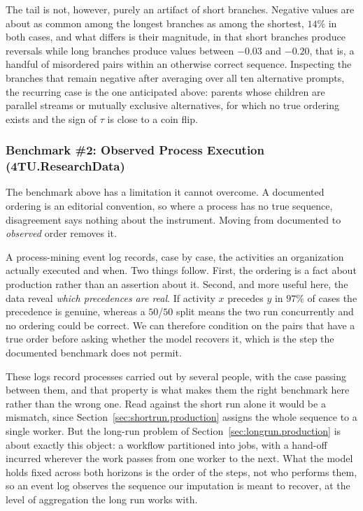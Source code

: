 The tail is not, however, purely an artifact of short branches.
Negative values are about as common among the longest branches as among the shortest, $14\%$ in both cases, and what differs is their magnitude, in that short branches produce reversals while long branches produce values between $-0.03$ and $-0.20$, that is, a handful of misordered pairs within an otherwise correct sequence.
Inspecting the branches that remain negative after averaging over all ten alternative prompts, the recurring case is the one anticipated above: parents whose children are parallel streams or mutually exclusive alternatives, for which no true ordering exists and the sign of $\tau$ is close to a coin flip.

\subsubsection{Benchmark \#2: Observed Process Execution (4TU.ResearchData)}
\label{app:eventlog_validation}

The benchmark above has a limitation it cannot overcome. A documented ordering is an editorial convention, so where a process has no true sequence, disagreement says nothing about the instrument.
Moving from documented to \emph{observed} order removes it.

A process-mining event log records, case by case, the activities an organization actually executed and when.
Two things follow.
First, the ordering is a fact about production rather than an assertion about it.
Second, and more useful here, the data reveal \emph{which precedences are real}. If activity $x$ precedes $y$ in $97\%$ of cases the precedence is genuine, whereas a $50$/$50$ split means the two run concurrently and no ordering could be correct.
We can therefore condition on the pairs that have a true order before asking whether the model recovers it, which is the step the documented benchmark does not permit.

These logs record processes carried out by several people, with the case passing between them, and that property is what makes them the right benchmark here rather than the wrong one.
Read against the short run alone it would be a mismatch, since Section~\ref{sec:shortrun.production} assigns the whole sequence to a single worker.
But the long-run problem of Section~\ref{sec:longrun.production} is about exactly this object: a workflow partitioned into jobs, with a hand-off incurred wherever the work passes from one worker to the next.
What the model holds fixed across both horizons is the order of the steps, not who performs them, so an event log observes the sequence our imputation is meant to recover, at the level of aggregation the long run works with.

